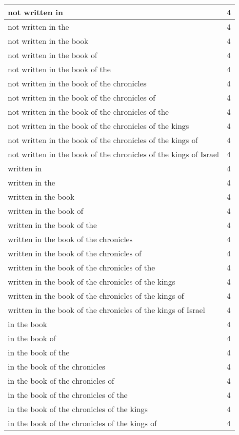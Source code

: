 \begin{center}
\begin{longtable}{|p{3.0in}|p{0.5in}|}
not written in & 4\\ \hline 
not written in the & 4\\ \hline 
not written in the book & 4\\ \hline 
not written in the book of & 4\\ \hline 
not written in the book of the & 4\\ \hline 
not written in the book of the chronicles & 4\\ \hline 
not written in the book of the chronicles of & 4\\ \hline 
not written in the book of the chronicles of the & 4\\ \hline 
not written in the book of the chronicles of the kings & 4\\ \hline 
not written in the book of the chronicles of the kings of & 4\\ \hline 
not written in the book of the chronicles of the kings of Israel & 4\\ \hline 
written in & 4\\ \hline 
written in the & 4\\ \hline 
written in the book & 4\\ \hline 
written in the book of & 4\\ \hline 
written in the book of the & 4\\ \hline 
written in the book of the chronicles & 4\\ \hline 
written in the book of the chronicles of & 4\\ \hline 
written in the book of the chronicles of the & 4\\ \hline 
written in the book of the chronicles of the kings & 4\\ \hline 
written in the book of the chronicles of the kings of & 4\\ \hline 
written in the book of the chronicles of the kings of Israel & 4\\ \hline 
in the book & 4\\ \hline 
in the book of & 4\\ \hline 
in the book of the & 4\\ \hline 
in the book of the chronicles & 4\\ \hline 
in the book of the chronicles of & 4\\ \hline 
in the book of the chronicles of the & 4\\ \hline 
in the book of the chronicles of the kings & 4\\ \hline 
in the book of the chronicles of the kings of & 4\\ \hline 

\end{longtable}
\end{center}
